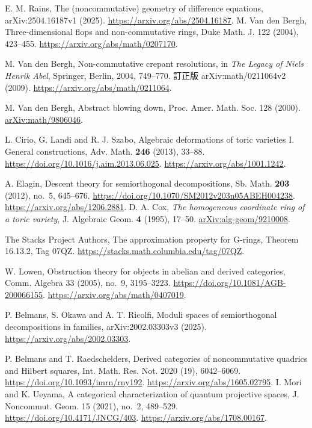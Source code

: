  E. M. Rains,
The (noncommutative) geometry of difference equations,
arXiv:2504.16187v1 (2025).
\url{https://arxiv.org/abs/2504.16187}.
 M. Van den Bergh,
Three-dimensional flops and non-commutative rings,
Duke Math. J. 122 (2004), 423--455.
\url{https://arxiv.org/abs/math/0207170}.

 M. Van den Bergh,
Non-commutative crepant resolutions,
in \emph{The Legacy of Niels Henrik Abel}, Springer, Berlin, 2004, 749--770.
訂正版 arXiv:math/0211064v2 (2009).
\url{https://arxiv.org/abs/math/0211064}.


 M. Van den Bergh,
Abstract blowing down,
Proc. Amer. Math. Soc. 128 (2000).
\href{https://arxiv.org/abs/math/9806046}{arXiv:math/9806046}.

 L. Cirio, G. Landi and R. J. Szabo,
Algebraic deformations of toric varieties I. General constructions,
Adv. Math. \textbf{246} (2013), 33--88.
\url{https://doi.org/10.1016/j.aim.2013.06.025}.
\url{https://arxiv.org/abs/1001.1242}.

 A. Elagin,
Descent theory for semiorthogonal decompositions,
Sb. Math. \textbf{203} (2012), no.~5, 645--676.
\url{https://doi.org/10.1070/SM2012v203n05ABEH004238}.
\url{https://arxiv.org/abs/1206.2881}.
D. A. Cox,
\emph{The homogeneous coordinate ring of a toric variety},
J. Algebraic Geom. \textbf{4} (1995), 17--50.
\href{https://arxiv.org/abs/alg-geom/9210008}{arXiv:alg-geom/9210008}.


 The Stacks Project Authors,
The approximation property for G-rings,
Theorem 16.13.2, Tag 07QZ.
\url{https://stacks.math.columbia.edu/tag/07QZ}.

 W. Lowen,
Obstruction theory for objects in abelian and derived categories,
Comm. Algebra 33 (2005), no.~9, 3195--3223.
\url{https://doi.org/10.1081/AGB-200066155}.
\url{https://arxiv.org/abs/math/0407019}.

 P. Belmans, S. Okawa and A. T. Ricolfi,
Moduli spaces of semiorthogonal decompositions in families,
arXiv:2002.03303v3 (2025).
\url{https://arxiv.org/abs/2002.03303}.

 P. Belmans and T. Raedschelders,
Derived categories of noncommutative quadrics and Hilbert squares,
Int. Math. Res. Not. 2020 (19), 6042--6069.
\url{https://doi.org/10.1093/imrn/rny192}.
\url{https://arxiv.org/abs/1605.02795}.
 I. Mori and K. Ueyama,
A categorical characterization of quantum projective spaces,
J. Noncommut. Geom. 15 (2021), no.~2, 489--529.
\url{https://doi.org/10.4171/JNCG/403}.
\url{https://arxiv.org/abs/1708.00167}.
